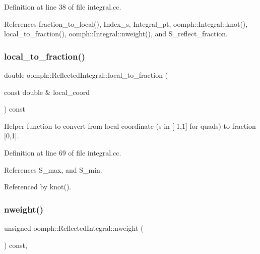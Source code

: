 Definition at line 38 of file integral.\+cc.



References fraction\+\_\+to\+\_\+local(), Index\+\_\+s, Integral\+\_\+pt, oomph\+::\+Integral\+::knot(), local\+\_\+to\+\_\+fraction(), oomph\+::\+Integral\+::nweight(), and S\+\_\+reflect\+\_\+fraction.

\mbox{\label{classoomph_1_1ReflectedIntegral_a80aea32b954d235adaff8889eb69cfcd}} 
\subsubsection{\texorpdfstring{local\+\_\+to\+\_\+fraction()}{local\_to\_fraction()}}
{\footnotesize\ttfamily double oomph\+::\+Reflected\+Integral\+::local\+\_\+to\+\_\+fraction (\begin{DoxyParamCaption}\item[{const double \&}]{local\+\_\+coord }\end{DoxyParamCaption}) const\hspace{0.3cm}{\ttfamily [private]}}



Helper function to convert from local coordinate (s in \mbox{[}-\/1,1\mbox{]} for quads) to fraction \mbox{[}0,1\mbox{]}. 



Definition at line 69 of file integral.\+cc.



References S\+\_\+max, and S\+\_\+min.



Referenced by knot().

\mbox{\label{classoomph_1_1ReflectedIntegral_ad448bbdee22baa638f492ef42327f0d3}} 
\subsubsection{\texorpdfstring{nweight()}{nweight()}}
{\footnotesize\ttfamily unsigned oomph\+::\+Reflected\+Integral\+::nweight (\begin{DoxyParamCaption}{ }\end{DoxyParamCaption}) const\hspace{0.3cm}{\ttfamily [inline]}, {\ttfamily [virtual]}}



